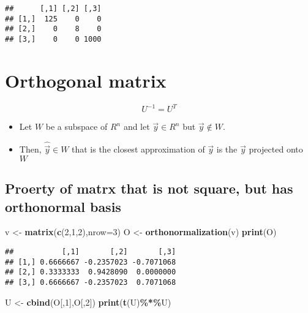 \documentclass[
]{article}
\newenvironment{Shaded}{\begin{snugshade}}{\end{snugshade}}
\newcommand{\AttributeTok}[1]{\textcolor[rgb]{0.13,0.29,0.53}{#1}}
\newcommand{\DecValTok}[1]{\textcolor[rgb]{0.00,0.00,0.81}{#1}}
\newcommand{\FunctionTok}[1]{\textcolor[rgb]{0.13,0.29,0.53}{\textbf{#1}}}
\newcommand{\NormalTok}[1]{#1}
\newcommand{\OtherTok}[1]{\textcolor[rgb]{0.56,0.35,0.01}{#1}}
\newcommand{\SpecialCharTok}[1]{\textcolor[rgb]{0.81,0.36,0.00}{\textbf{#1}}}
\providecommand{\tightlist}{%
  \setlength{\itemsep}{0pt}\setlength{\parskip}{0pt}}
\begin{document}
\begin{verbatim}
##      [,1] [,2] [,3]
## [1,]  125    0    0
## [2,]    0    8    0
## [3,]    0    0 1000
\end{verbatim}

\hypertarget{orthogonal-matrix}{%
\section{Orthogonal matrix}\label{orthogonal-matrix}}

\[U^{-1} = U^T\]

\begin{itemize}
\tightlist
\item
  Let \(W\) be a subspace of \(R^n\) and let \(\vec{y} \in R^n\) but
  \(\vec{y} \notin W\).\\
\item
  Then, \(\hat{\vec{y}} \in W\) that is the closest approximation of
  \(\vec{y}\) is the \(\vec{y}\) projected onto \(W\)
\end{itemize}

\hypertarget{proerty-of-matrx-that-is-not-square-but-has-orthonormal-basis}{%
\subsection{Proerty of matrx that is not square, but has orthonormal
basis}\label{proerty-of-matrx-that-is-not-square-but-has-orthonormal-basis}}

\begin{Shaded}
\begin{Highlighting}[]
\NormalTok{v }\OtherTok{\textless{}{-}} \FunctionTok{matrix}\NormalTok{(}\FunctionTok{c}\NormalTok{(}\DecValTok{2}\NormalTok{,}\DecValTok{1}\NormalTok{,}\DecValTok{2}\NormalTok{),}\AttributeTok{nrow=}\DecValTok{3}\NormalTok{)}
\NormalTok{O }\OtherTok{\textless{}{-}} \FunctionTok{orthonormalization}\NormalTok{(v)}
\FunctionTok{print}\NormalTok{(O)}
\end{Highlighting}
\end{Shaded}

\begin{verbatim}
##           [,1]       [,2]       [,3]
## [1,] 0.6666667 -0.2357023 -0.7071068
## [2,] 0.3333333  0.9428090  0.0000000
## [3,] 0.6666667 -0.2357023  0.7071068
\end{verbatim}

\begin{Shaded}
\begin{Highlighting}[]
\NormalTok{U }\OtherTok{\textless{}{-}} \FunctionTok{cbind}\NormalTok{(O[,}\DecValTok{1}\NormalTok{],O[,}\DecValTok{2}\NormalTok{])}
\FunctionTok{print}\NormalTok{(}\FunctionTok{t}\NormalTok{(U)}\SpecialCharTok{\%*\%}\NormalTok{U)}
\end{Highlighting}
\end{Shaded}
\end{document}
